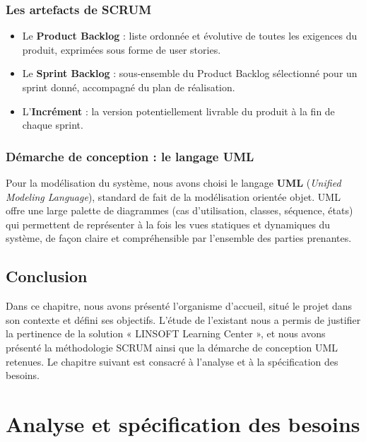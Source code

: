 \documentclass[12pt,a4paper,oneside]{report}
\begin{document}
\subsection{Les artefacts de SCRUM}
\begin{itemize}[leftmargin=1.2cm]
  \item Le \textbf{Product Backlog} : liste ordonnée et évolutive de toutes les exigences du
  produit, exprimées sous forme de user stories.
  \item Le \textbf{Sprint Backlog} : sous-ensemble du Product Backlog sélectionné pour un
  sprint donné, accompagné du plan de réalisation.
  \item L'\textbf{Incrément} : la version potentiellement livrable du produit à la fin de
  chaque sprint.
\end{itemize}

\subsection{Démarche de conception : le langage UML}
Pour la modélisation du système, nous avons choisi le langage \textbf{UML} (\textit{Unified
Modeling Language}), standard de fait de la modélisation orientée objet. UML offre une large
palette de diagrammes (cas d'utilisation, classes, séquence, états) qui permettent de
représenter à la fois les vues statiques et dynamiques du système, de façon claire et
compréhensible par l'ensemble des parties prenantes.

\section*{Conclusion}
Dans ce chapitre, nous avons présenté l'organisme d'accueil, situé le projet dans son contexte
et défini ses objectifs. L'étude de l'existant nous a permis de justifier la pertinence de la
solution « LINSOFT Learning Center », et nous avons présenté la méthodologie SCRUM ainsi que la
démarche de conception UML retenues. Le chapitre suivant est consacré à l'analyse et à la
spécification des besoins.
\clearpage

\chapter{Analyse et spécification des besoins}
\minitoc
\vspace{0.6cm}
\end{document}

